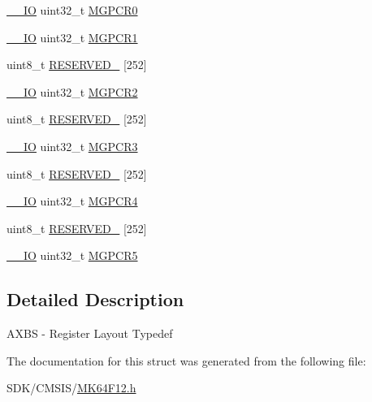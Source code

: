 \begin{DoxyCompactItemize}
\begin{tabbing}
\end{tabbing}\item 
\mbox{\hyperlink{core__cm4_8h_aec43007d9998a0a0e01faede4133d6be}{\+\_\+\+\_\+\+IO}} uint32\+\_\+t \mbox{\hyperlink{group___v_r_e_f___peripheral___access___layer_ga95040200b47ad000d4d10a0a3cc26328}{M\+G\+P\+C\+R0}}
\item 
\mbox{\hyperlink{core__cm4_8h_aec43007d9998a0a0e01faede4133d6be}{\+\_\+\+\_\+\+IO}} uint32\+\_\+t \mbox{\hyperlink{group___v_r_e_f___peripheral___access___layer_ga27bab6401c5712f0f544475a30c7f228}{M\+G\+P\+C\+R1}}
\item 
uint8\+\_\+t \mbox{\hyperlink{group___v_r_e_f___peripheral___access___layer_ga6f91643603313549f066d2f445fbe58b}{R\+E\+S\+E\+R\+V\+E\+D\+\_}} \mbox{[}252\mbox{]}
\item 
\mbox{\hyperlink{core__cm4_8h_aec43007d9998a0a0e01faede4133d6be}{\+\_\+\+\_\+\+IO}} uint32\+\_\+t \mbox{\hyperlink{group___v_r_e_f___peripheral___access___layer_ga7565ef72e26c5097db4bea3ec5fa9e14}{M\+G\+P\+C\+R2}}
\item 
uint8\+\_\+t \mbox{\hyperlink{group___v_r_e_f___peripheral___access___layer_gae6f7bcb4c19541862a0ea955208a38f2}{R\+E\+S\+E\+R\+V\+E\+D\+\_}} \mbox{[}252\mbox{]}
\item 
\mbox{\hyperlink{core__cm4_8h_aec43007d9998a0a0e01faede4133d6be}{\+\_\+\+\_\+\+IO}} uint32\+\_\+t \mbox{\hyperlink{group___v_r_e_f___peripheral___access___layer_gaf1901496c3e52eee108a21efaa7a4e17}{M\+G\+P\+C\+R3}}
\item 
uint8\+\_\+t \mbox{\hyperlink{group___v_r_e_f___peripheral___access___layer_ga269f43b5f47b1d3dadb76a9bb547eb2c}{R\+E\+S\+E\+R\+V\+E\+D\+\_}} \mbox{[}252\mbox{]}
\item 
\mbox{\hyperlink{core__cm4_8h_aec43007d9998a0a0e01faede4133d6be}{\+\_\+\+\_\+\+IO}} uint32\+\_\+t \mbox{\hyperlink{group___v_r_e_f___peripheral___access___layer_ga30337708f5ac98f037caf0dbc449801b}{M\+G\+P\+C\+R4}}
\item 
uint8\+\_\+t \mbox{\hyperlink{group___v_r_e_f___peripheral___access___layer_gac434c3049fc8beb09dd04d55973be5a5}{R\+E\+S\+E\+R\+V\+E\+D\+\_}} \mbox{[}252\mbox{]}
\item 
\mbox{\hyperlink{core__cm4_8h_aec43007d9998a0a0e01faede4133d6be}{\+\_\+\+\_\+\+IO}} uint32\+\_\+t \mbox{\hyperlink{group___v_r_e_f___peripheral___access___layer_gade0f01dbebdaf29c21c507b7acf1ae33}{M\+G\+P\+C\+R5}}
\end{DoxyCompactItemize}


\subsection{Detailed Description}
A\+X\+BS -\/ Register Layout Typedef 

The documentation for this struct was generated from the following file\+:\begin{DoxyCompactItemize}
\item 
S\+D\+K/\+C\+M\+S\+I\+S/\mbox{\hyperlink{_m_k64_f12_8h}{M\+K64\+F12.\+h}}\end{DoxyCompactItemize}
